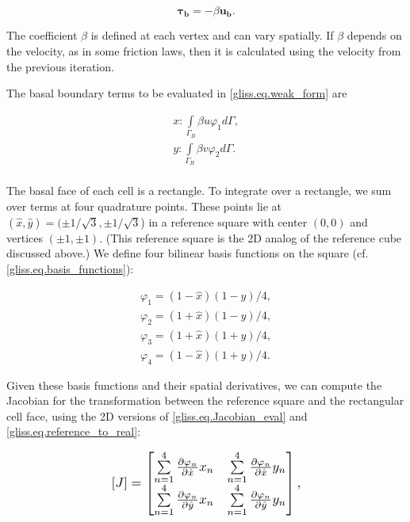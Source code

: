 \begin{equation}
  \label{gliss.eq.beta_tau}
  \mathbf{\tau_b} = -\beta \mathbf{u_b}.  
\end{equation}

\noindent
The coefficient $\beta$ is defined at each vertex and can vary spatially.  
If $\beta$ depends on the velocity, as in some friction laws,
then it is calculated using the velocity from the previous iteration.

The basal boundary terms to be evaluated in \eqref{gliss.eq.weak_form} are

\begin{equation}
  \label{gliss.eq.basal_bc}
  \begin{split}
    x: \int\limits_{{\Gamma }_{B}} \beta u{{\varphi }_{1}} d\Gamma , \\
    y: \int\limits_{{\Gamma }_{B}} \beta v{{\varphi }_{2}} d\Gamma . \\
  \end{split}
\end{equation}

\noindent
The basal face of each cell is a rectangle. To integrate over a rectangle, we 
sum over terms at four quadrature points.  These points lie at $(\hat{x},\hat{y}) = (\pm 1/\sqrt{3}, \pm 1/\sqrt{3}$)
in a reference square with center $(0,0)$ and vertices $(\pm1,\pm1)$.
(This reference square is the 2D analog of the reference cube discussed above.)
We define four bilinear basis functions on the square (cf. \eqref{gliss.eq.basis_functions}):

\begin{equation}
  \label{gliss.eq.basis_functions_2d}
  \begin{matrix}
    {{\varphi }_{1}}=(1-\hat{x})(1-\hat{y})/4,  \\[3pt]
    {{\varphi }_{2}}=(1+\hat{x})(1-\hat{y})/4,  \\[3pt]
    {{\varphi }_{3}}=(1+\hat{x})(1+\hat{y})/4,  \\[3pt]
    {{\varphi }_{4}}=(1-\hat{x})(1+\hat{y})/4.
  \end{matrix}
\end{equation}

\noindent
Given these basis functions and their spatial derivatives, we can compute the Jacobian
for the transformation between the reference square and the rectangular cell face,
using the 2D versions of \eqref{gliss.eq.Jacobian_eval} and \eqref{gliss.eq.reference_to_real}:

\begin{equation}
  \label{gliss.eq.Jacobian_eval_2d}
  \scalebox{1.2}{
  $
        [J]=\left[ \begin{matrix}
            \sum\limits_{n=1}^{4}{\frac{\partial {{\varphi }_{n}}}{\partial \hat{x}}{{x}_{n}}} & \sum\limits_{n=1}^{4}{\frac{\partial {{\varphi }_{n}}}{\partial \hat{x}}{{y}_{n}}} \\[6pt]
            \sum\limits_{n=1}^{4}{\frac{\partial {{\varphi }_{n}}}{\partial \hat{y}}{{x}_{n}}} & \sum\limits_{n=1}^{4}{\frac{\partial {{\varphi }_{n}}}{\partial \hat{y}}{{y}_{n}}} \\[6pt]
          \end{matrix} \right],
        $
        }
\end{equation}

